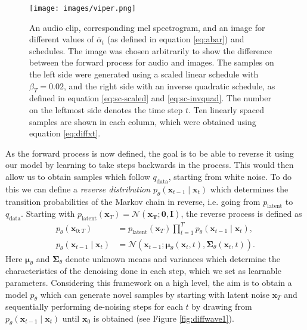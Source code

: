 \documentclass{report}
\begin{document}
\begin{figure}[H]
    \centering
    \texttt{[image: images/viper.png]}
    \caption{\onehalfspacing An audio clip, corresponding mel spectrogram, and an image for different values of $\bar{\alpha}_t$ (as defined in equation \ref{eq:abar}) and schedules. The image was chosen arbitrarily to show the difference between the forward process for audio and images. The samples on the left side were generated using a scaled linear schedule with $\beta_T=0.02$, and the right side with an inverse quadratic schedule, as defined in equation \ref{eq:sc-scaled} and \ref{eq:sc-invquad}. The number on the leftmost side denotes the time step $t$. Ten linearly spaced samples are shown in each column, which were obtained using equation \ref{eq:diffxt}.}
    \label{fig:viper}
\end{figure}

As the forward process is now defined, the goal is to be able to reverse it using our model by learning to take steps backwards in the process. This would then allow us to obtain samples which follow $q_{\text{data}}$, starting from white noise. To do this we can define a \textit{reverse distribution} $p_{\theta}(\bm{x}_{t-1} \mid \bm{x}_t)$ which determines the transition probabilities of the Markov chain in reverse, i.e. going from $p_{\text{latent}}$ to $q_{\text{data}}$. Starting with $p_{\text{latent}}(\bm{x}_T)=\mathcal{N}(\bm{x_T}; \bm{0}, \bm{I})$, the reverse process is defined as
\begin{align}
    p_{\theta}(\bm{x}_{0:T}) &= p_{\text{latent}}(\bm{x}_T) \prod_{t=1}^{T} p_{\theta}(\bm{x}_{t-1} \mid \bm{x}_{t}), \\
    p_{\theta}(\bm{x}_{t-1} \mid \bm{x}_{t}) &= \mathcal{N}(\bm{x}_{t-1} ; \bm{\mu}_{\theta}(\bm{x}_t, t), \bm{\Sigma}_{\theta}(\bm{x}_t, t)) \label{eq:ptheta}.
\end{align}
Here $\bm{\mu}_{\theta}$ and $\bm{\Sigma}_{\theta}$ denote unknown means and variances which determine the characteristics of the denoising done in each step, which we set as learnable parameters. Considering this framework on a high level, the aim is to obtain a model $p_\theta$ which can generate novel samples by starting with latent noise $\bm{x}_T$ and sequentially performing de-noising steps for each $t$ by drawing from $p_\theta(\bm{x}_{t-1} \mid \bm{x}_t)$ until $\bm{x}_0$ is obtained (see Figure \ref{fig:diffwave1}).
\end{document}
